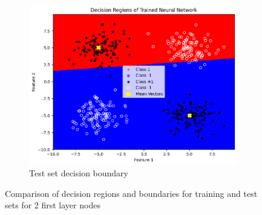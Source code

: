 \documentclass[a4paper,12pt]{article}
\begin{document}
\begin{figure}[H]
    \begin{subfigure}{0.45\textwidth}
        \centering
        \includegraphics[width=\textwidth]{2.2_2_Test.png}
        \caption{Test set decision boundary}
    \end{subfigure}

    \caption{Comparison of decision regions and boundaries for training and test sets for 2 first layer nodes} 
\end{figure}
\end{document}
